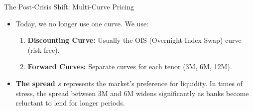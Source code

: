 \documentclass{beamer}
\begin{document}
\begin{frame}{The Post-Crisis Shift: Multi-Curve Pricing}
	\begin{itemize}
		\item Today, we no longer use one curve. We use:
		\begin{enumerate}
			\item \textbf{Discounting Curve:} Usually the OIS (Overnight Index Swap) curve (risk-free).
			\item \textbf{Forward Curves:} Separate curves for each tenor (3M, 6M, 12M).
		\end{enumerate}
		\item \textbf{The spread $s$} represents the market's preference for liquidity. In times of stress, the spread between 3M and 6M widens significantly as banks become reluctant to lend for longer periods.
	\end{itemize}

\end{frame}
\end{document}
